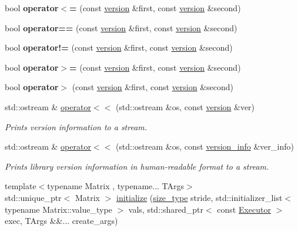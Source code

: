 \begin{DoxyCompactItemize}
bool {\bfseries operator$<$=} (const \hyperlink{structgko_1_1version}{version} \&first, const \hyperlink{structgko_1_1version}{version} \&second)
\item 
\mbox{\label{namespacegko_aeeaafa7179e5dbc1f1c02197598664fb}} 
bool {\bfseries operator==} (const \hyperlink{structgko_1_1version}{version} \&first, const \hyperlink{structgko_1_1version}{version} \&second)
\item 
\mbox{\label{namespacegko_af2d150bb18c9fbdc62c2a02315bd908b}} 
bool {\bfseries operator!=} (const \hyperlink{structgko_1_1version}{version} \&first, const \hyperlink{structgko_1_1version}{version} \&second)
\item 
\mbox{\label{namespacegko_ac033cb13ef2c4d291a894f26d2c64862}} 
bool {\bfseries operator$>$=} (const \hyperlink{structgko_1_1version}{version} \&first, const \hyperlink{structgko_1_1version}{version} \&second)
\item 
\mbox{\label{namespacegko_aa6724904a78b5293c610d113e3b23682}} 
bool {\bfseries operator$>$} (const \hyperlink{structgko_1_1version}{version} \&first, const \hyperlink{structgko_1_1version}{version} \&second)
\item 
std\+::ostream \& \hyperlink{namespacegko_ae0ef652f487afe43aebcf778038ff780}{operator$<$$<$} (std\+::ostream \&os, const \hyperlink{structgko_1_1version}{version} \&ver)
\begin{DoxyCompactList}\small\item\em Prints version information to a stream. \end{DoxyCompactList}\item 
std\+::ostream \& \hyperlink{namespacegko_ad9e3ba96a10fe47a03ceef39b45bd43c}{operator$<$$<$} (std\+::ostream \&os, const \hyperlink{classgko_1_1version__info}{version\+\_\+info} \&ver\+\_\+info)
\begin{DoxyCompactList}\small\item\em Prints library version information in human-\/readable format to a stream. \end{DoxyCompactList}\item 
{\footnotesize template$<$typename Matrix , typename... T\+Args$>$ }\\std\+::unique\+\_\+ptr$<$ Matrix $>$ \hyperlink{group__mat__formats_ga2f54bac1e95fb3ef03974fa9c9088491}{initialize} (\hyperlink{namespacegko_a6e5c95df0ae4e47aab2f604a22d98ee7}{size\+\_\+type} stride, std\+::initializer\+\_\+list$<$ typename Matrix\+::value\+\_\+type $>$ vals, std\+::shared\+\_\+ptr$<$ const \hyperlink{classgko_1_1Executor}{Executor} $>$ exec, T\+Args \&\&... create\+\_\+args)

\end{DoxyCompactItemize}
